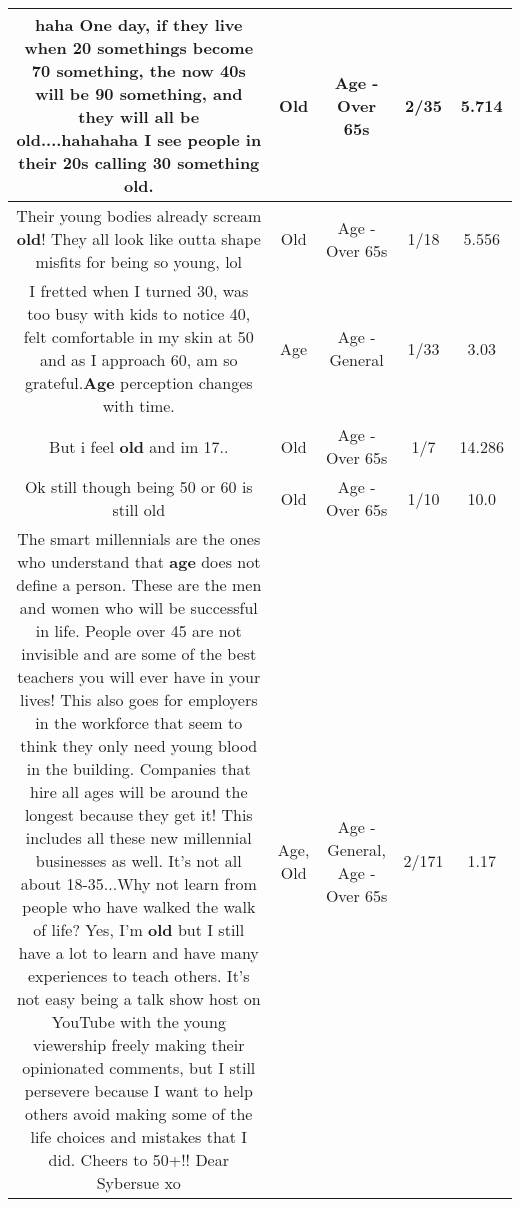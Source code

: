 \documentclass[11pt]{article}
\newlength\mylength
\begin{document}
\begin{center}
\begin{longtable}{|C{.65\mylength}|C{.30\mylength}|C{.12\mylength}|C{.12\mylength}|C{.12\mylength}|}
  \small haha One day, if they live when 20 somethings become 70 something, the now 40s will be 90 something, and they will all be \textbf{old}....hahahaha  I see people in their 20s calling 30 something \textbf{old}.\normalsize   & Old & Age - Over 65s & 2/35 & 5.714 \\  \hline
  \small Their young bodies already scream \textbf{old}! They all look like outta shape misfits for being so young, lol\normalsize   & Old & Age - Over 65s & 1/18 & 5.556 \\  \hline
  \small I fretted when I turned 30, was too busy with kids to notice 40,  felt comfortable in my skin at 50 and as I approach 60, am so grateful.\textbf{Age} perception changes with time.\normalsize   & Age & Age - General & 1/33 & 3.03 \\  \hline
  \small But i feel \textbf{old} and im 17..\normalsize   & Old & Age - Over 65s & 1/7 & 14.286 \\  \hline
  \small Ok still though being 50 or 60 is still old\normalsize   & Old & Age - Over 65s & 1/10 & 10.0 \\  \hline
  \small The smart millennials are the ones who understand that \textbf{age} does not define a person. These are the men and women who will be successful in life. People over 45 are not invisible and are some of the best teachers you will ever have in your lives! This also goes for employers in the workforce that seem to think they only need young blood in the building. Companies that hire all ages will be around the longest because they get it! This includes all these new millennial businesses as well. It's not all about 18-35...Why not learn from people who have walked the walk of life? Yes, I'm \textbf{old} but I still have a lot to learn and have many experiences to teach others. It's not easy being a talk show host on YouTube with the young viewership freely making their opinionated comments, but I still persevere because I want to help others avoid making some of the life choices and mistakes that I did.  Cheers to 50+!! Dear Sybersue xo\normalsize   & Age, Old & Age - General, Age - Over 65s & 2/171 & 1.17 \\  \hline

\end{longtable}
\end{center}
\end{document}
